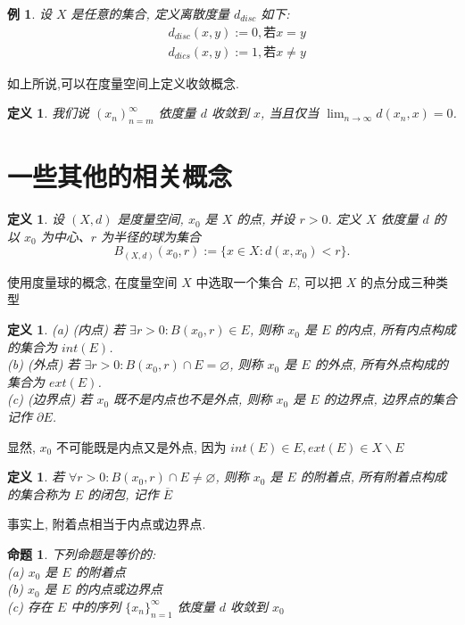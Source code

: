 \documentclass[12pt, a4paper, oneside]{ctexart}
\newtheorem{definition}[theorem]{定义}
\newtheorem{example}[theorem]{例}
\newtheorem{proposition}[theorem]{命题}
\begin{document}
\begin{example}
    设 $X$ 是任意的集合, 定义离散度量 $d_{disc}$ 如下:
    $$
        \begin{aligned}
            & d_{disc}(x, y):=0, \text{若} x=y\\
            & d_{dics}(x, y):=1, \text{若} x\neq y
        \end{aligned}
    $$
\end{example}

如上所说,可以在度量空间上定义收敛概念.

\begin{definition}
    我们说 $(x_n)^{\infty}_{n=m}$ 依度量 $d$ 收敛到 $x$, 当且仅当 $\lim_{n\to\infty}d(x_n, x)=0$.
\end{definition}

\section{一些其他的相关概念}

\begin{definition}
    设 $(X, d)$ 是度量空间, $x_0$ 是 $X$ 的点, 并设 $r>0$. 定义 $X$ 依度量 $d$ 的以 $x_0$ 为中心、$r$ 为半径的球为集合
    $$
        B_{(X, d)}(x_0,r) := \{x\in X:d(x, x_0)<r\}.
    $$
\end{definition}

使用度量球的概念, 在度量空间 $X$ 中选取一个集合 $E$, 可以把 $X$ 的点分成三种类型

\begin{definition}
    (a) (内点) 若 $\exists r>0:B(x_0, r)\in E$, 则称 $x_0$ 是 $E$ 的内点, 所有内点构成的集合为 $int(E)$.\\
    (b) (外点) 若 $\exists r>0:B(x_0, r)\cap E=\varnothing$, 则称 $x_0$ 是 $E$ 的外点, 所有外点构成的集合为 $ext(E)$.\\
    (c) (边界点) 若 $x_0$ 既不是内点也不是外点, 则称 $x_0$ 是 $E$ 的边界点, 边界点的集合记作 $\partial E$.
\end{definition}

显然, $x_0$ 不可能既是内点又是外点, 因为 $int(E)\in E,ext(E)\in X\backslash E$

\begin{definition}
    若 $\forall r>0:B(x_0, r)\cap E\neq \varnothing$, 则称 $x_0$ 是 $E$ 的附着点, 所有附着点构成的集合称为 $E$ 的闭包, 记作 $\overline{E}$
\end{definition}

事实上, 附着点相当于内点或边界点.

\begin{proposition}
    下列命题是等价的:\\
    (a) $x_0$ 是 $E$ 的附着点\\
    (b) $x_0$ 是 $E$ 的内点或边界点\\
    (c) 存在 $E$ 中的序列 $\{x_n\}_{n=1}^{\infty}$ 依度量 $d$ 收敛到 $x_0$
\end{proposition}
\end{document}
